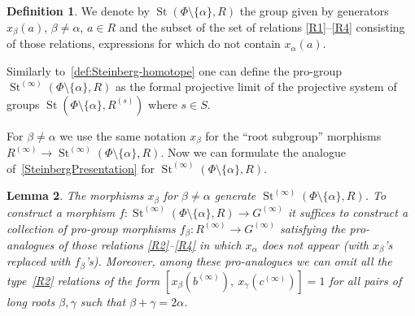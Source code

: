 \documentclass[oneside, 11pt]{amsart}
\numberwithin{equation}{section}
\newtheorem{lemma}{Lemma} \numberwithin{lemma}{section}
\theoremstyle{definition}
\newtheorem{df}[lemma]{Definition} \Crefname{df}{Definition}{Definitions}
\theoremstyle{remark}
\DeclareMathOperator\St{St}
\begin{document}
\begin{df}
We denote by $\St(\Phi\setminus\{\alpha\}, R)$ the group given by generators $x_\beta(a)$, $\beta \neq \alpha$, $a\in R$ and the subset of the set of relations \eqref{R1}--\eqref{R4} consisting of those relations, expressions for which do not contain $x_{\alpha}(a)$. %

Similarly to~\cref{def:Steinberg-homotope} one can define the pro-group $\St^{(\infty)}(\Phi \setminus\{ \alpha\}, R)$ as
the formal projective limit of the projective system of groups $\St(\Phi\setminus\{ \alpha\}, R^{(s)})$ where $s\in S$.
\end{df}

For $\beta \neq \alpha$ we use the same notation $x_\beta$ for the ``root subgroup'' morphisms $R^{(\infty)}\to \St^{(\infty)}(\Phi \setminus\{\alpha\}, R)$.
Now we can formulate the analogue of~\cref{SteinbergPresentation} for $\St^{(\infty)}(\Phi \setminus \{ \alpha \}, R)$.
\begin{lemma}\label{rem:xpma-presentation}
The morphisms $x_\beta$ for $\beta\neq \alpha$ generate $\St^{(\infty)}(\Phi\setminus\{\alpha\}, R)$. To construct a morphism $f \colon \St^{(\infty)}(\Phi\setminus\{\alpha\}, R) \to G^{(\infty)}$ it suffices to construct a collection of pro-group morphisms $f_\beta \colon R^{(\infty)} \to G^{(\infty)}$ satisfying the pro-analogues of those relations \eqref{R2}--\eqref{R4} in which $x_\alpha$ does not appear (with $x_\beta$'s replaced with $f_\beta$'s). Moreover, among these pro-analogues we can omit all the type~\eqref{R2} relations of the form $[x_\beta(b^{(\infty)}),\ x_\gamma(c^{(\infty)})] = 1$ for all pairs of long roots \(\beta, \gamma\) such that \(\beta + \gamma = 2\alpha\).
\end{lemma}
\end{document}
